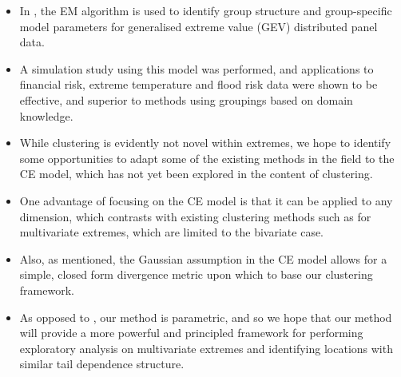 \documentclass{article}
\numberwithin{equation}{section}
\begin{document}
\begin{itemize}
  \item In \citet{Dupuis2023}, the EM algorithm is used to identify group structure and group-specific model parameters for generalised extreme value (GEV) distributed panel data.
  \item A simulation study using this model was performed, and applications to financial risk, extreme temperature and flood risk data were shown to be effective, and superior to methods using groupings based on domain knowledge.
\end{itemize}

\vspace{1cm}

\begin{itemize}
  \item While clustering is evidently not novel within extremes, we hope to identify some opportunities to adapt some of the existing methods in the field to the CE model, which has not yet been explored in the content of clustering.
  \item One advantage of focusing on the CE model is that it can be applied to any dimension, which contrasts with existing clustering methods such as \citet{Vignotto2021} for multivariate extremes, which are limited to the bivariate case.  
  \item Also, as mentioned, the Gaussian assumption in the CE model allows for a simple, closed form divergence metric upon which to base our clustering framework.
  \item As opposed to \citet{Vignotto2021}, our method is parametric, and so we hope that our method will provide a more powerful and principled framework for performing exploratory analysis on multivariate extremes and identifying locations with similar tail dependence structure.
\end{itemize}

\vspace{1cm}
\end{document}
